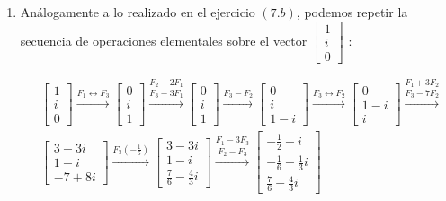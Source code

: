 \documentclass[a4paper,12pt,twoside,spanish,reqno]{amsbook}
\numberwithin{equation}{section}
\begin{document}
\begin{enumerate}
\begin{enumerate}
\

\item Análogamente a lo realizado en el  ejercicio $(7.b)$, podemos repetir la secuencia de operaciones elementales sobre el vector $\left[\begin{array}{c}1\\i\\0 \end{array}\right]$ :

\begin{align*}
& \left[\begin{array}{c}1\\i\\0 \end{array}\right]
\stackrel{F_1 \leftrightarrow F_3}{\longrightarrow}
\left[\begin{array}{c}0\\i\\1 \end{array}\right]
\stackrel{F_2 - 2 F_1}{\stackrel{F_3 - 3 F_1}{\longrightarrow}}
\left[\begin{array}{c}0\\i\\1 \end{array}\right]
\stackrel{F_3-F_2}{\longrightarrow}
\left[\begin{array}{c}0\\i\\1-i \end{array}\right]
\stackrel{F_3 \leftrightarrow F_2}{\longrightarrow} 
\left[\begin{array}{c}0\\1-i\\i \end{array}\right]
\stackrel{F_1 + 3 F_2}{\stackrel{F_3-7F_2}{\longrightarrow}} \\
&\left[\begin{array}{c} 3 - 3i \\1-i\\ -7 + 8i \end{array}\right]
\stackrel{F_3 (-\frac{1}{6}) }{\longrightarrow}
\left[\begin{array}{c} 3 - 3i \\1-i\\ \frac{7}{6} - \frac{4}{3} i \end{array}\right]
\stackrel{F_1 - 3 F_3}{\stackrel{F_2 - F_3 }{\longrightarrow}}
\left[\begin{array}{c} -\frac{1}{2}+i \\ -\frac{1}{6}+\frac{1}{3}i \\ \frac{7}{6}-\frac{4}{3} i \end{array}\right]
\end{align*}


\end{enumerate}
\end{enumerate}
\end{document}
